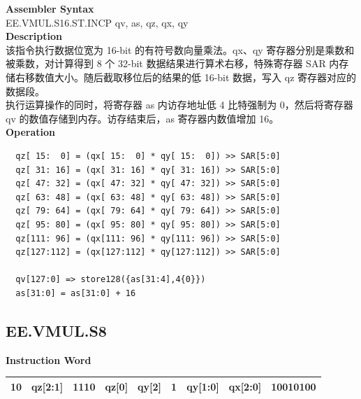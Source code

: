 \textbf{Assembler Syntax} \\
EE.VMUL.S16.ST.INCP qv, as, qz, qx, qy \\
\textbf{Description} \\
该指令执行数据位宽为 16-bit 的有符号数向量乘法。qx、qy 寄存器分别是乘数和被乘数，对计算得到 8 个 32-bit 数据结果进行算术右移，特殊寄存器 SAR 内存储右移数值大小。随后截取移位后的结果的低 16-bit 数据，写入 qz 寄存器对应的数据段。\\ 执行运算操作的同时，将寄存器 as 内访存地址低 4 比特强制为 0，然后将寄存器 qv 的数值存储到内存。访存结束后，as 寄存器内数值增加 16。\\
\textbf{Operation}
\begin{lstlisting}
  qz[ 15:  0] = (qx[ 15:  0] * qy[ 15:  0]) >> SAR[5:0]
  qz[ 31: 16] = (qx[ 31: 16] * qy[ 31: 16]) >> SAR[5:0]
  qz[ 47: 32] = (qx[ 47: 32] * qy[ 47: 32]) >> SAR[5:0]
  qz[ 63: 48] = (qx[ 63: 48] * qy[ 63: 48]) >> SAR[5:0]
  qz[ 79: 64] = (qx[ 79: 64] * qy[ 79: 64]) >> SAR[5:0]
  qz[ 95: 80] = (qx[ 95: 80] * qy[ 95: 80]) >> SAR[5:0]
  qz[111: 96] = (qx[111: 96] * qy[111: 96]) >> SAR[5:0]
  qz[127:112] = (qx[127:112] * qy[127:112]) >> SAR[5:0]

  qv[127:0] => store128({as[31:4],4{0}})
  as[31:0] = as[31:0] + 16
\end{lstlisting}

\clearpage
\subsection{EE.VMUL.S8}\label{instruction:EEVMULS8}
\setlength\tabcolsep{6pt}
\textbf{Instruction Word} \\
\begin{tabular}{|c|c|c|c|c|c|c|c|c|}
	\hline
	10 & qz[2:1] & 1110 & qz[0] & qy[2] & 1 & qy[1:0] & qx[2:0] & 10010100 \\
	\hline
\end{tabular}

